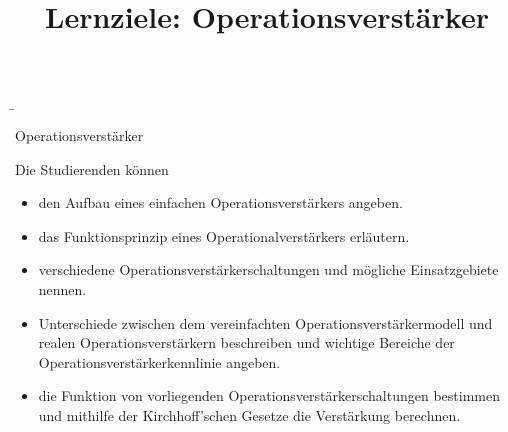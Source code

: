 \begin{frame}
    \b{
        \begin{Lernziele}{Operationsverstärker}
            \title{Lernziele: Operationsverstärker}
            Die Studierenden können
            \begin{itemize}
                \item den Aufbau eines einfachen Operationsverstärkers angeben.
                \item das Funktionsprinzip eines Operationalverstärkers erläutern.
                \item verschiedene Operationsverstärkerschaltungen und mögliche Einsatzgebiete nennen. 
                \item Unterschiede zwischen dem vereinfachten Operationsverstärkermodell und realen Operationsverstärkern beschreiben und wichtige Bereiche der Operationsverstärkerkennlinie angeben.
                \item die Funktion von vorliegenden Operationsverstärkerschaltungen bestimmen und mithilfe der Kirchhoff'schen Gesetze die Verstärkung berechnen.
            \end{itemize}
        \end{Lernziele}    
    }





    
\end{frame}

